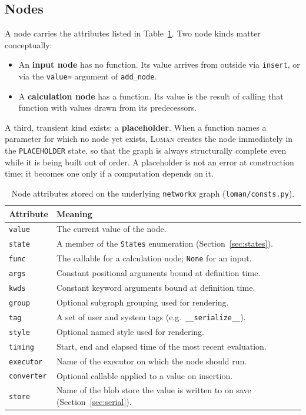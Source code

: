 \documentclass[11pt,a4paper]{article}
\newcommand{\loman}{\textsc{Loman}}
\newcommand{\code}[1]{\texttt{#1}}
\begin{document}
\subsection{Nodes}

A node carries the attributes listed in Table~\ref{tab:nodeattrs}. Two node
kinds matter conceptually:

\begin{itemize}
  \item An \textbf{input node} has no function. Its value arrives from outside
  via \code{insert}, or via the \code{value=} argument of \code{add\_node}.
  \item A \textbf{calculation node} has a function. Its value is the result of
  calling that function with values drawn from its predecessors.
\end{itemize}

A third, transient kind exists: a \textbf{placeholder}. When a function names a
parameter for which no node yet exists, \loman{} creates the node immediately
in the \code{PLACEHOLDER} state, so that the graph is always structurally
complete even while it is being built out of order. A placeholder is not an
error at construction time; it becomes one only if a computation depends on it.

\begin{table}[t]
\centering
\caption{Node attributes stored on the underlying \code{networkx} graph
(\code{loman/consts.py}).}
\label{tab:nodeattrs}
\begin{tabular}{@{}lp{9.6cm}@{}}
\toprule
Attribute & Meaning \\
\midrule
\code{value}     & The current value of the node. \\
\code{state}     & A member of the \code{States} enumeration (Section~\ref{sec:states}). \\
\code{func}      & The callable for a calculation node; \code{None} for an input. \\
\code{args}      & Constant positional arguments bound at definition time. \\
\code{kwds}      & Constant keyword arguments bound at definition time. \\
\code{group}     & Optional subgraph grouping used for rendering. \\
\code{tag}       & A set of user and system tags (e.g.\ \code{\_\_serialize\_\_}). \\
\code{style}     & Optional named style used for rendering. \\
\code{timing}    & Start, end and elapsed time of the most recent evaluation. \\
\code{executor}  & Name of the executor on which the node should run. \\
\code{converter} & Optional callable applied to a value on insertion. \\
\code{store}     & Name of the blob store the value is written to on save (Section~\ref{sec:serial}). \\
\bottomrule
\end{tabular}
\end{table}
\end{document}
